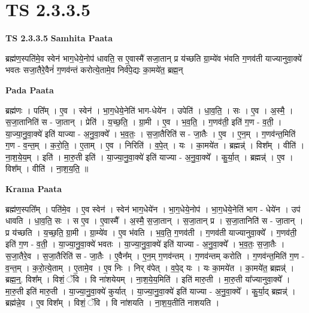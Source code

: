 \documentclass[17pt]{extarticle}
\begin{document}
\section*{ TS 2.3.3.5 }

\textbf{TS 2.3.3.5 } \newline
\textbf{Samhita Paata} \newline

ब्रह्म॑ण॒स्पति॑मे॒व स्वेन॑ भाग॒धेये॒नोप॑ धावति॒ स ए॒वास्मै॑ सजा॒तान् प्र य॑च्छति ग्रा॒म्ये॑व भ॑वति ग॒णव॑ती याज्यानुवा॒क्ये॑ भवतः सजा॒तैरे॒वैनं॑ ग॒णव॑न्तं करोत्ये॒तामे॒व निर्व॑पे॒द्यः का॒मये॑त॒ ब्रह्म॒न् \newline

\textbf{Pada Paata} \newline

ब्रह्म॑णः । पति᳚म् । ए॒व । स्वेन॑ । भा॒ग॒धेये॒नेति॑ भाग-धेये॑न । उपेति॑ । धा॒व॒ति॒ । सः । ए॒व । अ॒स्मै॒ । स॒जा॒तानिति॑ स - जा॒तान् । प्रेति॑ । य॒च्छ॒ति॒ । ग्रा॒मी । ए॒व । भ॒व॒ति॒ । ग॒णव॑ती॒ इति॑ ग॒ण - व॒ती॒ । या॒ज्या॒नु॒वा॒क्ये॑ इति॑ याज्या - अ॒नु॒वा॒क्ये᳚ । भ॒व॒तः॒ । स॒जा॒तैरिति॑ स - जा॒तैः । ए॒व । ए॒न॒म् । ग॒णव॑न्त॒मिति॑ ग॒ण - व॒न्त॒म् । क॒रो॒ति॒ । ए॒ताम् । ए॒व । निरिति॑ । व॒पे॒त् । यः । का॒मये॑त । ब्रह्मन्न्॑ । विश᳚म् । वीति॑ । ना॒श॒ये॒य॒म् । इति॑ । मा॒रु॒ती इति॑ । या॒ज्या॒नु॒वा॒क्ये॑ इति॑ याज्या - अ॒नु॒वा॒क्ये᳚ । कु॒र्या॒त् । ब्रह्मन्न्॑ । ए॒व । विश᳚म् । वीति॑ । ना॒श॒य॒ति॒ ॥  \newline


\textbf{Krama Paata} \newline

ब्रह्म॑ण॒स्पति᳚म् । पति॑मे॒व । ए॒व स्वेन॑ । स्वेन॑ भाग॒धेये॑न । भा॒ग॒धेये॒नोप॑ । भा॒ग॒धेये॒नेति॑ भाग - धेये॑न । उप॑ धावति । धा॒व॒ति॒ सः । स ए॒व । ए॒वास्मै᳚ । अ॒स्मै॒ स॒जा॒तान् । स॒जा॒तान् प्र । स॒जा॒तानिति॑ स - जा॒तान् । प्र य॑च्छति । य॒च्छ॒ति॒ ग्रा॒मी । ग्रा॒म्ये॑व । ए॒व भ॑वति । भ॒व॒ति॒ ग॒णव॑ती । ग॒णव॑ती याज्यानुवा॒क्ये᳚ । ग॒णव॑ती॒ इति॑ ग॒ण - व॒ती॒ । या॒ज्या॒नु॒वा॒क्ये॑ भवतः । या॒ज्या॒नु॒वा॒क्ये॑ इति॑ याज्या - अ॒नु॒वा॒क्ये᳚ । भ॒व॒तः॒ स॒जा॒तैः । स॒जा॒तैरे॒व । स॒जा॒तैरिति॑ स - जा॒तैः । ए॒वैन᳚म् । ए॒न॒म् ग॒णव॑न्तम् । ग॒णव॑न्तम् करोति । ग॒णव॑न्त॒मिति॑ ग॒ण - व॒न्त॒म् । क॒रो॒त्ये॒ताम् । ए॒तामे॒व । ए॒व निः । निर् व॑पेत् । व॒पे॒द् यः । यः का॒मये॑त । का॒मये॑त॒ ब्रह्मन्न्॑ । ब्रह्म॒न्॒. विश᳚म् । विशं॒ ॅवि । वि ना॑शयेयम् । ना॒श॒ये॒य॒मिति॑ । इति॑ मारु॒ती । मा॒रु॒ती या᳚ज्यानुवा॒क्ये᳚ । मा॒रु॒ती इति॑ मारु॒ती । या॒ज्या॒नु॒वा॒क्ये॑ कुर्यात् । या॒ज्या॒नु॒वा॒क्ये॑ इति॑ याज्या - अ॒नु॒वा॒क्ये᳚ । कु॒र्या॒द् ब्रह्मन्न्॑ । ब्रह्म॑न्ने॒व । ए॒व विश᳚म् । विशं॒ ॅवि । वि ना॑शयति । ना॒श॒य॒तीति॑ नाशयति । \newline
\end{document}
